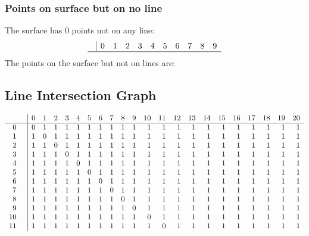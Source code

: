 \documentclass{article}
\begin{document}
{\subsubsection*{Points on surface but on no line}
The surface has 0 points not on any line:\\
$$
\begin{array}{r|*{10}{r}}
 & 0 & 1 & 2 & 3 & 4 & 5 & 6 & 7 & 8 & 9\\
\hline
\end{array}
$$
The points on the surface but not on lines are:\\
\begin{multicols}{2}
\noindent
\end{multicols}
\subsection*{Line Intersection Graph}
{\arraycolsep=1pt
$$
\begin{array}{rr|*{21}r}
 &  & 0 & 1 & 2 & 3 & 4 & 5 & 6 & 7 & 8 & 9 & 10 & 11 & 12 & 13 & 14 & 15 & 16 & 17 & 18 & 19 & 20\\
\hline
0 &  & 0 & 1 & 1 & 1 & 1 & 1 & 1 & 1 & 1 & 1 & 1 & 1 & 1 & 1 & 1 & 1 & 1 & 1 & 1 & 1 & 1\\
1 &  & 1 & 0 & 1 & 1 & 1 & 1 & 1 & 1 & 1 & 1 & 1 & 1 & 1 & 1 & 1 & 1 & 1 & 1 & 1 & 1 & 1\\
2 &  & 1 & 1 & 0 & 1 & 1 & 1 & 1 & 1 & 1 & 1 & 1 & 1 & 1 & 1 & 1 & 1 & 1 & 1 & 1 & 1 & 1\\
3 &  & 1 & 1 & 1 & 0 & 1 & 1 & 1 & 1 & 1 & 1 & 1 & 1 & 1 & 1 & 1 & 1 & 1 & 1 & 1 & 1 & 1\\
4 &  & 1 & 1 & 1 & 1 & 0 & 1 & 1 & 1 & 1 & 1 & 1 & 1 & 1 & 1 & 1 & 1 & 1 & 1 & 1 & 1 & 1\\
5 &  & 1 & 1 & 1 & 1 & 1 & 0 & 1 & 1 & 1 & 1 & 1 & 1 & 1 & 1 & 1 & 1 & 1 & 1 & 1 & 1 & 1\\
6 &  & 1 & 1 & 1 & 1 & 1 & 1 & 0 & 1 & 1 & 1 & 1 & 1 & 1 & 1 & 1 & 1 & 1 & 1 & 1 & 1 & 1\\
7 &  & 1 & 1 & 1 & 1 & 1 & 1 & 1 & 0 & 1 & 1 & 1 & 1 & 1 & 1 & 1 & 1 & 1 & 1 & 1 & 1 & 1\\
8 &  & 1 & 1 & 1 & 1 & 1 & 1 & 1 & 1 & 0 & 1 & 1 & 1 & 1 & 1 & 1 & 1 & 1 & 1 & 1 & 1 & 1\\
9 &  & 1 & 1 & 1 & 1 & 1 & 1 & 1 & 1 & 1 & 0 & 1 & 1 & 1 & 1 & 1 & 1 & 1 & 1 & 1 & 1 & 1\\
10 &  & 1 & 1 & 1 & 1 & 1 & 1 & 1 & 1 & 1 & 1 & 0 & 1 & 1 & 1 & 1 & 1 & 1 & 1 & 1 & 1 & 1\\
11 &  & 1 & 1 & 1 & 1 & 1 & 1 & 1 & 1 & 1 & 1 & 1 & 0 & 1 & 1 & 1 & 1 & 1 & 1 & 1 & 1 & 1\\

\end{array}$$}}
\end{document}
